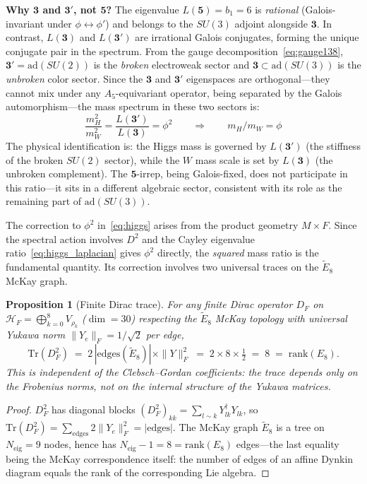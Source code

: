 \documentclass[12pt,a4paper]{article}
\newtheorem{proposition}{Proposition}
\theoremstyle{definition}
\begin{document}
\textbf{Why $\mathbf{3}$ and $\mathbf{3'}$, not $\mathbf{5}$?}  The eigenvalue $L(\mathbf{5}) = b_1 = 6$ is \emph{rational} (Galois-invariant under $\phi \leftrightarrow \phi'$) and belongs to the $SU(3)$ adjoint alongside $\mathbf{3}$.  In contrast, $L(\mathbf{3})$ and $L(\mathbf{3'})$ are irrational Galois conjugates, forming the unique conjugate pair in the spectrum.  From the gauge decomposition~\eqref{eq:gauge138}, $\mathbf{3'} = \mathrm{ad}(SU(2))$ is the \emph{broken} electroweak sector and $\mathbf{3} \subset \mathrm{ad}(SU(3))$ is the \emph{unbroken} color sector.  Since the $\mathbf{3}$ and $\mathbf{3'}$ eigenspaces are orthogonal---they cannot mix under any $A_5$-equivariant operator, being separated by the Galois automorphism---the mass spectrum in these two sectors is:
\begin{equation}
\frac{m_H^2}{m_W^2} = \frac{L(\mathbf{3'})}{L(\mathbf{3})} = \phi^2 \qquad \Longrightarrow \qquad m_H/m_W = \phi
\end{equation}
The physical identification is: the Higgs mass is governed by $L(\mathbf{3'})$ (the stiffness of the broken $SU(2)$ sector), while the $W$ mass scale is set by $L(\mathbf{3})$ (the unbroken complement).  The $\mathbf{5}$-irrep, being Galois-fixed, does not participate in this ratio---it sits in a different algebraic sector, consistent with its role as the remaining part of $\mathrm{ad}(SU(3))$.

The correction to $\phi^2$ in~\eqref{eq:higgs} arises from the product geometry $M \times F$.  Since the spectral action involves $D^2$ and the Cayley eigenvalue ratio~\eqref{eq:higgs_laplacian} gives $\phi^2$ directly, the \emph{squared} mass ratio is the fundamental quantity.  Its correction involves two universal traces on the $\widetilde{E}_8$ McKay graph.

\begin{proposition}[Finite Dirac trace]\label{prop:trdf2}
For any finite Dirac operator $D_F$ on $\mathcal{H}_F = \bigoplus_{k=0}^{8} V_{\rho_k}$ ($\dim = 30$) respecting the $\widetilde{E}_8$ McKay topology with universal Yukawa norm $\|Y_e\|_F = 1/\sqrt{2}$ per edge,
\[
\mathrm{Tr}(D_F^2) \;=\; 2\,|\mathrm{edges}(\widetilde{E}_8)|\times \|Y\|_F^2 \;=\; 2 \times 8 \times \tfrac{1}{2} \;=\; 8 \;=\; \mathrm{rank}(E_8).
\]
This is independent of the Clebsch--Gordan coefficients: the trace depends only on the Frobenius norms, not on the internal structure of the Yukawa matrices.
\end{proposition}
\begin{proof}
$D_F^2$ has diagonal blocks $(D_F^2)_{kk} = \sum_{l\sim k} Y_{lk}^\dagger Y_{lk}$, so $\mathrm{Tr}(D_F^2) = \sum_{\text{edges}} 2\|Y_e\|_F^2 = |\text{edges}|$.  The McKay graph $\widetilde{E}_8$ is a tree on $N_{\text{eig}} = 9$ nodes, hence has $N_{\text{eig}} - 1 = 8 = \mathrm{rank}(E_8)$ edges---the last equality being the McKay correspondence itself: the number of edges of an affine Dynkin diagram equals the rank of the corresponding Lie algebra.
\end{proof}
\end{document}
